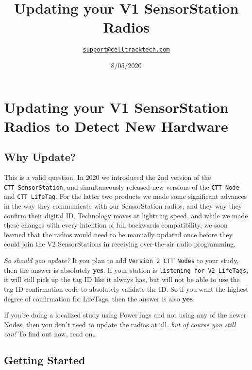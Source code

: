 \documentclass[
]{article}
\title{Updating your V1 SensorStation Radios}
\author{\href{mailto:support@celltracktech.com}{\nolinkurl{support@celltracktech.com}}}
\date{8/05/2020}
\begin{document}
\maketitle

{
\setcounter{tocdepth}{2}
\tableofcontents
}
\hypertarget{updating-your-v1-sensorstation-radios-to-detect-new-hardware}{%
\section{Updating your V1 SensorStation Radios to Detect New
Hardware}\label{updating-your-v1-sensorstation-radios-to-detect-new-hardware}}

\hypertarget{why-update}{%
\subsection{Why Update?}\label{why-update}}

This is a valid question. In 2020 we introduced the 2nd version of the
\texttt{CTT\ SensorStation}, and simultaneously released new versions of
the \texttt{CTT\ Node} and \texttt{CTT\ LifeTag}. For the latter two
products we made some significant advances in the way they communicate
with our SensorStation radios, and they way they confirm their digital
ID. Technology moves at lightning speed, and while we made these changes
with every intention of full backwards compatibility, we soon learned
that the radios would need to be manually updated once before they could
join the V2 SensorStations in receiving over-the-air radio programming.

\emph{So should you update?} If you plan to add
\texttt{Version\ 2\ CTT\ Nodes} to your study, then the answer is
absolutely \textbf{yes}. If your station is
\texttt{listening\ for\ V2\ LifeTags}, it will still pick up the tag ID
like it always has, but will not be able to use the tag ID confirmation
code to absolutely validate the ID. So if you want the highest degree of
confirmation for LifeTags, then the answer is also \textbf{yes}.

If you're doing a localized study using PowerTags and not using any of
the newer Nodes, then you don't need to update the radios at
all\ldots{}\emph{but of course you still can!} To find out how, read
on\ldots{}

\hypertarget{getting-started}{%
\subsection{Getting Started}\label{getting-started}}
\end{document}
